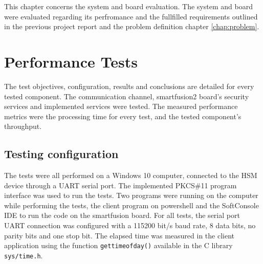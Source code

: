 \cleardoublepage
\label{chap:evaluation}

This chapter concerns the system and board evaluation. The system and board were evaluated regarding its perfromance and the fullfilled requirements outlined in the previous project report and the problem definition chapter \ref{chap:problem}.
\section{Performance Tests}\label{chap:evaluation:performance}

The test objectives, configuration, results and conclusions are detailed for every tested component.
The communication channel, smartfusion2 board's security services and implemented services were tested.
The measured performance metrics were the processing time for every test, and the tested component's throughput.

\subsection{Testing configuration}\label{chap:evaluation:performance:config}

The tests were all performed on a Windows 10 computer, connected to the HSM device through a \ac{UART} serial port. The implemented PKCS\#11 program interface was used to run the tests.
Two programs were running on the computer while performing the tests, the client program on powershell and the SoftConsole IDE to run the code on the smartfusion board.
For all tests, the serial port UART connection was configured with a 115200 bit/s baud rate, 8 data bits, no parity bits and one stop bit.
The elapsed time was measured in the client application using the function \texttt{gettimeofday()} available in the C library \texttt{sys/time.h}.

